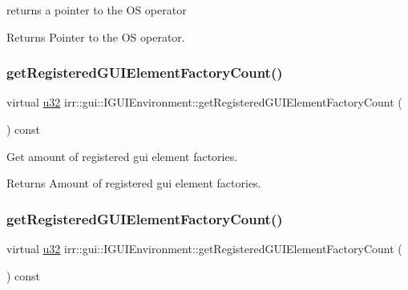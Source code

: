 returns a pointer to the OS operator 

\begin{DoxyReturn}{Returns}
Pointer to the OS operator. 
\end{DoxyReturn}
\mbox{\label{classirr_1_1gui_1_1IGUIEnvironment_a022dcd144b1f955180569ef2ee844561}} 
\subsubsection{\texorpdfstring{get\+Registered\+G\+U\+I\+Element\+Factory\+Count()}{getRegisteredGUIElementFactoryCount()}\hspace{0.1cm}{\footnotesize\ttfamily [1/2]}}
{\footnotesize\ttfamily virtual \hyperlink{namespaceirr_a0416a53257075833e7002efd0a18e804}{u32} irr\+::gui\+::\+I\+G\+U\+I\+Environment\+::get\+Registered\+G\+U\+I\+Element\+Factory\+Count (\begin{DoxyParamCaption}{ }\end{DoxyParamCaption}) const\hspace{0.3cm}{\ttfamily [pure virtual]}}



Get amount of registered gui element factories. 

\begin{DoxyReturn}{Returns}
Amount of registered gui element factories. 
\end{DoxyReturn}
\mbox{\label{classirr_1_1gui_1_1IGUIEnvironment_a022dcd144b1f955180569ef2ee844561}} 
\subsubsection{\texorpdfstring{get\+Registered\+G\+U\+I\+Element\+Factory\+Count()}{getRegisteredGUIElementFactoryCount()}\hspace{0.1cm}{\footnotesize\ttfamily [2/2]}}
{\footnotesize\ttfamily virtual \hyperlink{namespaceirr_a0416a53257075833e7002efd0a18e804}{u32} irr\+::gui\+::\+I\+G\+U\+I\+Environment\+::get\+Registered\+G\+U\+I\+Element\+Factory\+Count (\begin{DoxyParamCaption}{ }\end{DoxyParamCaption}) const\hspace{0.3cm}{\ttfamily [pure virtual]}}



